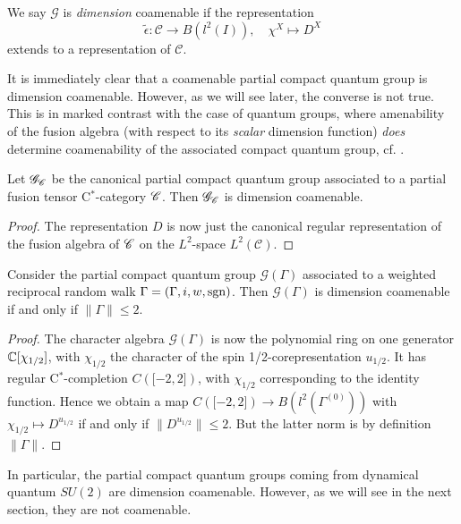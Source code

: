 
\begin{Def} We say $\mathscr{G}$ is \emph{dimension} coamenable %
if the representation \[\tilde{\epsilon}: \mathscr{C} \rightarrow B(l^2(I)), \quad \chi^X \mapsto D^X\] extends to a representation of $\mathcal{C}$.
\end{Def}

It is immediately clear that a coamenable partial compact quantum group is dimension coamenable. However, as we will see later, the converse is not true. This is in marked contrast with the case of quantum groups, where amenability of the fusion algebra (with respect to its \emph{scalar} dimension function) \emph{does} determine coamenability of the associated compact quantum group, cf. \cite[Theorem 4.5]{Kye1}.
 
\begin{Prop} Let $\mathscr{G}_{\mathscr{C}}$ be the canonical partial compact quantum group associated to a partial fusion tensor C$^*$-category $\mathscr{C}$. Then $\mathscr{G}_{\mathscr{C}}$ is dimension coamenable.  
\end{Prop}%
\begin{proof} The representation $D$ is now just the canonical regular representation of the fusion algebra of $\mathscr{C}$ on the $L^2$-space $L^2(\mathcal{C})$. 
 \end{proof}
 
 \begin{Prop} Consider the partial compact quantum group $\mathscr{G}(\Gamma)$ associated to a weighted reciprocal random walk $\Gamma = (\Gamma,i,w,\operatorname{\mathrm{sgn}})$. Then $\mathscr{G}(\Gamma)$ is dimension coamenable if and only if $\|\Gamma\| \leq 2$. 
 \end{Prop}%
 \begin{proof}
 The character algebra $\mathscr{G}(\Gamma)$ is now the polynomial ring on one generator $\mathbb{C}\lbrack \chi_{1/2}\rbrack$, with $\chi_{1/2}$ the character of the spin 1/2-corepresentation $u_{1/2}$. It has regular C$^*$-completion $C(\lbrack -2,2\rbrack)$, with $\chi_{1/2}$ corresponding to the identity function. Hence we obtain a map $C(\lbrack -2,2\rbrack) \rightarrow B(l^2(\Gamma^{(0)}))$ with $\chi_{1/2}\mapsto D^{u_{1/2}}$ if and only if $\|D^{u_{1/2}}\| \leq  2$. But the latter norm is by definition $\|\Gamma\|$.   
 \end{proof} 
 
 In particular, the partial compact quantum groups coming from dynamical quantum $SU(2)$ are dimension coamenable. However, as we will see in the next section, they are not coamenable.